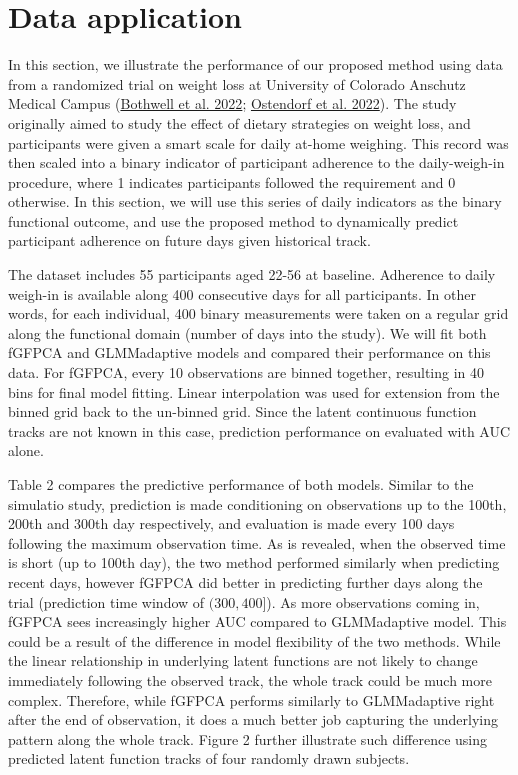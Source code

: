 \documentclass[
  11pt,
]{article}
\begin{document}
\hypertarget{data-application}{%
\section{Data application}\label{data-application}}

In this section, we illustrate the performance of our proposed method
using data from a randomized trial on weight loss at University of
Colorado Anschutz Medical Campus
(\protect\hyperlink{ref-bothwell2022}{Bothwell et al. 2022};
\protect\hyperlink{ref-ostendorf2022}{Ostendorf et al. 2022}). The study
originally aimed to study the effect of dietary strategies on weight
loss, and participants were given a smart scale for daily at-home
weighing. This record was then scaled into a binary indicator of
participant adherence to the daily-weigh-in procedure, where 1 indicates
participants followed the requirement and 0 otherwise. In this section,
we will use this series of daily indicators as the binary functional
outcome, and use the proposed method to dynamically predict participant
adherence on future days given historical track.

The dataset includes 55 participants aged 22-56 at baseline. Adherence
to daily weigh-in is available along 400 consecutive days for all
participants. In other words, for each individual, 400 binary
measurements were taken on a regular grid along the functional domain
(number of days into the study). We will fit both fGFPCA and
GLMMadaptive models and compared their performance on this data. For
fGFPCA, every 10 observations are binned together, resulting in 40 bins
for final model fitting. Linear interpolation was used for extension
from the binned grid back to the un-binned grid. Since the latent
continuous function tracks are not known in this case, prediction
performance on evaluated with AUC alone.

Table 2 compares the predictive performance of both models. Similar to
the simulatio study, prediction is made conditioning on observations up
to the 100th, 200th and 300th day respectively, and evaluation is made
every 100 days following the maximum observation time. As is revealed,
when the observed time is short (up to 100th day), the two method
performed similarly when predicting recent days, however fGFPCA did
better in predicting further days along the trial (prediction time
window of \((300, 400]\)). As more observations coming in, fGFPCA sees
increasingly higher AUC compared to GLMMadaptive model. This could be a
result of the difference in model flexibility of the two methods. While
the linear relationship in underlying latent functions are not likely to
change immediately following the observed track, the whole track could
be much more complex. Therefore, while fGFPCA performs similarly to
GLMMadaptive right after the end of observation, it does a much better
job capturing the underlying pattern along the whole track. Figure 2
further illustrate such difference using predicted latent function
tracks of four randomly drawn subjects.
\end{document}
